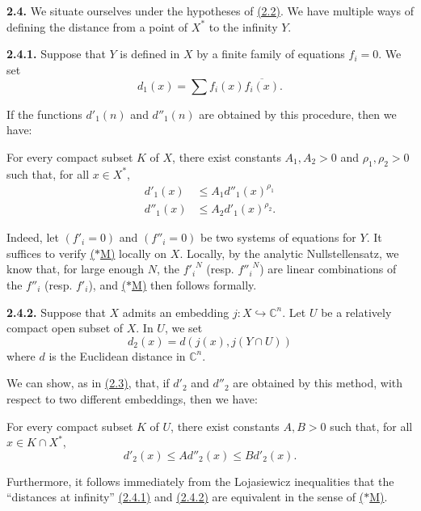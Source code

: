 \documentclass{report}
\newenvironment{itenv*}
  {\phantomsection\par\medskip\noindent\itshape}
  {\medskip}
\newenvironment{rmenv}[1]
  {\phantomsection\par\medskip\noindent\textbf{#1.}\rmfamily}
  {\medskip}
\newcommand{\CC}{\mathbb{C}}
\renewcommand{\leq}{\leqslant}
\newcommand{\oldpage}[1]{\marginpar{\footnotesize$\Big\vert$ \textit{p.~#1}}}
\begin{document}
\begin{rmenv}{2.4}
\label{II.2.4}
  We situate ourselves under the hypotheses of \hyperref[II.2.2]{(2.2)}.
  We have multiple ways of defining the distance from a point of $X^*$ to the infinity $Y$.

  \begin{rmenv}{2.4.1}
  \label{II.2.4.1}
    Suppose that $Y$ is defined in $X$ by a finite family of equations $f_i=0$.
    We set
\oldpage{62}
    \[
      d_1(x) = \sum f_i(x)\overline{f_i(x)}.
    \]

    If the functions $d'_1(n)$ and $d''_1(n)$ are obtained by this procedure, then we have:

    \begin{itenv*}
    \label{II.2.4.1.*M}
      For every compact subset $K$ of $X$, there exist constants $A_1,A_2>0$ and $\rho_1,\rho_2>0$ such that, for all $x\in X^*$,
      \[
        \begin{aligned}
          d'_1(x) &\leq A_1d''_1(x)^{\rho_1}
        \\d''_1(x) &\leq A_2d'_1(x)^{\rho_2}.
        \end{aligned}
      \tag{$*$M}
      \]
    \end{itenv*}

    Indeed, let $(f'_i=0)$ and $(f''_i=0)$ be two systems of equations for $Y$.
    It suffices to verify \hyperref[II.2.4.1.*M]{($*$M)} locally on $X$.
    Locally, by the analytic Nullstellensatz, we know that, for large enough $N$, the ${f'_i}^N$ (resp. ${f''_i}^N$) are linear combinations of the $f''_i$ (resp. $f'_i$), and \hyperref[II.2.4.1.*M]{($*$M)} then follows formally.
  \end{rmenv}

  \begin{rmenv}{2.4.2}
  \label{II.2.4.2}
    Suppose that $X$ admits an embedding $j\colon X\hookrightarrow\CC^n$.
    Let $U$ be a relatively compact open subset of $X$.
    In $U$, we set
    \[
      d_2(x) = d(j(x),j(Y\cap U))
    \]
    where $d$ is the Euclidean distance in $\CC^n$.

    We can show, as in \hyperref[II.2.3]{(2.3)}, that, if $d'_2$ and $d''_2$ are obtained by this method, with respect to two different embeddings, then we have:

    \begin{itenv*}
    \label{II.2.4.2.*R}
      For every compact subset $K$ of $U$, there exist constants $A,B>0$ such that, for all $x\in K\cap X^*$,
      \[
        d'_2(x) \leq Ad''_2(x) \leq Bd'_2(x).
      \tag{$*$R}
      \]
    \end{itenv*}

    Furthermore, it follows immediately from the Lojasiewicz inequalities \cite[Th.~1, p.~85]{18} that the ``distances at infinity'' \hyperref[II.2.4.1]{(2.4.1)} and \hyperref[II.2.4.2]{(2.4.2)} are equivalent in the sense of \hyperref[II.2.4.1.*M]{($*$M)}.
  \end{rmenv}
\end{rmenv}
\end{document}
